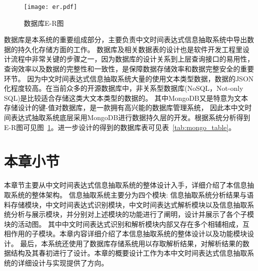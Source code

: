 \begin{figure}[h]
  \centering
  \texttt{[image: er.pdf]}
  \caption{数据库E-R图}
  \label{fig:er_graph}
\end{figure}

数据库是本系统的重要组成部分，主要负责中文时间表达式信息抽取系统中导出数据的持久化存储方面的工作。
数据库及相关数据表的设计也是软件开发工程里设计流程中非常关键的步骤之一，因为数据库的设计关系到上层查询接口的易用性，查询效率以及数据的完整性和一致性，是保障数据存储效率和数据完整安全的重要环节。
因为中文时间表达式信息抽取系统大量的使用文本类型数据，数据的JSON化程度较高。在当前众多的开源数据库中，非关系型数据库(NoSQL，Not-only SQL)是比较适合存储这类大文本类型的数据的。
其中MongoDB又是特意为文本存储设计的键-值对数据库，是一款拥有高兴能的数据库管理系统，
因此本中文时间表达式抽取系统底层采用MongoDB进行数据持久层的开发。根据系统分析得到E-R图可见图~\ref{fig:er_graph}。进一步设计的得到的数据库表可见表~\ref{tab:mongo_table}。

\section{本章小节}

本章节主要从中文时间表达式信息抽取系统的整体设计入手，详细介绍了本信息抽取系统的整体架构。
信息抽取系统主要分为四个模块: 信息抽取系统分析结果与语料存储模块，中文时间表达式识别模块，中文时间表达式解析模块以及信息抽取系统分析与展示模块，并分别对上述模块的功能进行了阐明，设计并展示了各个子模块的活动图。
其中中文时间表达式识别和解析模块内部又存在多个相辅相成，互相作用的子模块。本章内容详细介绍了本信息抽取系统的整体设计以及功能模块设计。
最后，本系统还使用了数据库存储系统用以存取解析结果，对解析结果的数据结构及其春初进行了设计。本章的概要设计工作为本中文时间表达式信息抽取系统的详细设计与实现提供了方向。
